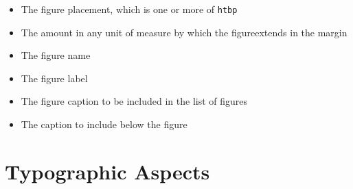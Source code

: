 \begin{itemize}
	\item  The figure placement, which is one or more of \texttt{htbp}
	\item The amount in any unit of measure by which the figureextends in the margin
	\item The figure name
	\item The figure label
	\item The figure caption to be included in the list of figures
	\item The caption to include below the figure
\end{itemize}


\section{Typographic Aspects}

